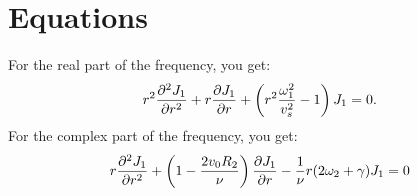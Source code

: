 \documentclass[12pt]{article}
\begin{document}
	\section{Equations}
	For the real part of the frequency, you get:
	\begin{equation}
	r^2\pdv[2]{J_1}{r} + r\pdv{J_1}{r} + \left(r^2\frac{\omega_1^2}{v_s^2} - 1 \right)J_1 = 0.
	\end{equation}
	For the complex part of the frequency, you get:
	\begin{equation}
	r\pdv[2]{J_1}{r} + \left(1 - \frac{2v_0R_2}{\nu}\right)\pdv{J_1}{r} - \frac{1}{\nu}r(2\omega_2 + \gamma)J_1=0
	\end{equation}
\end{document}

